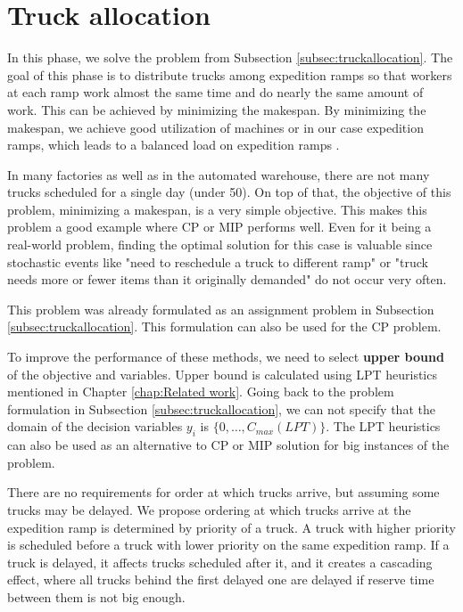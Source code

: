 \documentclass{ctuthesis}
\begin{document}
\section{Truck allocation}
\label{sec:truckallocationprop}
In this phase, we solve the problem from Subsection \ref{subsec:truckallocation}. The goal of this phase is to distribute trucks among expedition ramps so that workers at each ramp work almost the same time and do nearly the same amount of work. This can be achieved by minimizing the makespan. By minimizing the makespan, we achieve good utilization of machines or in our case expedition ramps, which leads to a balanced load on expedition ramps \cite{pinedo}. 

In many factories as well as in the automated warehouse, there are not many trucks scheduled for a single day (under 50). On top of that, the objective of this problem, minimizing a makespan, is a very simple objective. This makes this problem a good example where CP or MIP performs well. Even for it being a real-world problem, finding the optimal solution for this case is valuable since stochastic events like "need to reschedule a truck to different ramp" or "truck needs more or fewer items than it originally demanded" do not occur very often.

This problem was already formulated as an assignment problem in Subsection \ref{subsec:truckallocation}. This formulation can also be used for the CP problem.

To improve the performance of these methods, we need to select \textbf{upper bound} of the objective and variables. Upper bound is calculated using LPT heuristics mentioned in Chapter \ref{chap:Related work}. Going back to the problem formulation in Subsection \ref{subsec:truckallocation}, we can not specify that the domain of the decision variables $y_i$ is $\{0, \ldots, C_{max}(LPT)\}$. The LPT heuristics can also be used as an alternative to CP or MIP solution for big instances of the problem.

There are no requirements for order at which trucks arrive, but assuming some trucks may be delayed. We propose ordering at which trucks arrive at the expedition ramp is determined by priority of a truck. A truck with higher priority is scheduled before a truck with lower priority on the same expedition ramp. If a truck is delayed, it affects trucks scheduled after it, and it creates a cascading effect, where all trucks behind the first delayed one are delayed if reserve time between them is not big enough.
\end{document}
